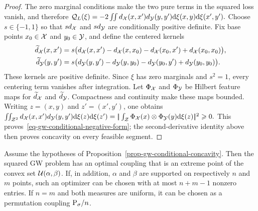 \begin{proof}
The zero marginal conditions make the two pure terms in the squared loss vanish, and therefore
\(\mathcal Q_L(\xi) = -2\iint \dist_\X(x,x')\dist_\Y(y,y')\d\xi(x,y)\d\xi(x',y').\)
Choose $s\in\{-1,1\}$ so that $s\dist_\X$ and $s\dist_\Y$ are conditionally positive definite. Fix base points $x_0\in\X$ and $y_0\in\Y$, and define the centered kernels
\begin{align*}
\widetilde{\dist}_\X(x,x')
&=s\bigl(\dist_\X(x,x')-\dist_\X(x,x_0)-\dist_\X(x_0,x')+\dist_\X(x_0,x_0)\bigr),\\
\widetilde{\dist}_\Y(y,y')
&=s\bigl(\dist_\Y(y,y')-\dist_\Y(y,y_0)-\dist_\Y(y_0,y')+\dist_\Y(y_0,y_0)\bigr).
\end{align*}
These kernels are positive definite. Since $\xi$ has zero marginals and $s^2=1$, every centering term vanishes after integration. Let $\Phi_\X$ and $\Phi_\Y$ be Hilbert feature maps for $\widetilde{\dist}_\X$ and $\widetilde{\dist}_\Y$. Compactness and continuity make these maps bounded. Writing $z=(x,y)$ and $z'=(x',y')$, one obtains
\(\iint_{\mathcal Z^2}\dist_\X(x,x')\dist_\Y(y,y')\d\xi(z)\d\xi(z') = \norm{\int_{\mathcal Z}\Phi_\X(x)\otimes\Phi_\Y(y)\d\xi(z)}^2 \geq0.\)
This proves~\eqref{eq-gw-conditional-negative-form}; the second-derivative identity above then proves concavity on every feasible segment.
\end{proof}
\begin{prop}\label{prop-gw-extreme-optimal-coupling}
Assume the hypotheses of Proposition~\ref{prop-gw-conditional-concavity}. Then the squared GW problem has an optimal coupling that is an extreme point of the convex set $\Couplings(\alpha,\beta)$. If, in addition, $\alpha$ and $\beta$ are supported on respectively $n$ and $m$ points, such an optimizer can be chosen with at most $n+m-1$ nonzero entries. If $n=m$ and both measures are uniform, it can be chosen as a permutation coupling $\P_\sigma/n$.
\end{prop}
